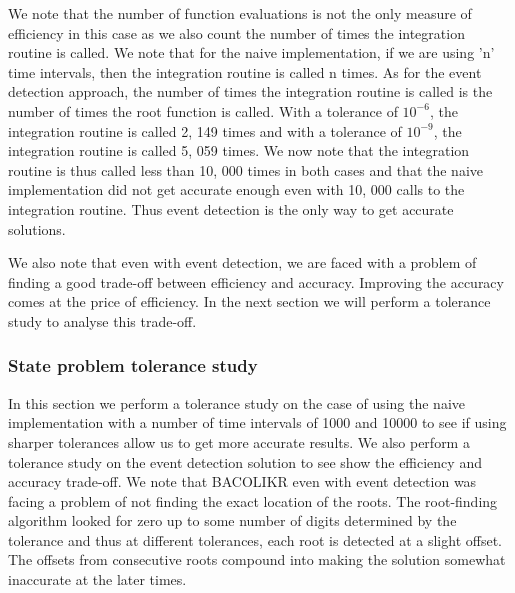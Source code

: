 \documentclass{article}
\begin{document}
We note that the number of function evaluations is not the only measure of efficiency in this case as we also count the number of times the integration routine is called. We note that for the naive implementation, if we are using 'n' time intervals, then the integration routine is called n times. As for the event detection approach, the number of times the integration routine is called is the number of times the root function is called. With a tolerance of $10^{-6}$, the integration routine is called 2, 149 times and with a tolerance of $10^{-9}$, the integration routine is called 5, 059 times. We now note that the integration routine is thus called less than 10, 000 times in both cases and that the naive implementation did not get accurate enough even with 10, 000 calls to the integration routine. Thus event detection is the only way to get accurate solutions.

We also note that even with event detection, we are faced with a problem of finding a good trade-off between efficiency and accuracy. Improving the accuracy comes at the price of efficiency. In the next section we will perform a tolerance study to analyse this trade-off.

\subsubsection{State problem tolerance study}
\label{subsubsection:pde_state_tol_study}
In this section we perform a tolerance study on the case of using the naive implementation with a number of time intervals of 1000 and 10000 to see if using sharper tolerances allow us to get more accurate results. We also perform a tolerance study on the event detection solution to see show the efficiency and accuracy trade-off. We note that BACOLIKR even with event detection was facing a problem of not finding the exact location of the roots. The root-finding algorithm looked for zero up to some number of digits determined by the tolerance and thus at different tolerances, each root is detected at a slight offset. The offsets from consecutive roots compound into making the solution somewhat inaccurate at the later times. 
\end{document}
